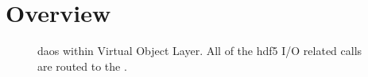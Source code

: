 \documentclass[../users_guide.tex]{subfiles}
\begin{document}
\section{Overview}

\begin{figure}
\centering

\caption{\acrshort{daos} within Virtual Object Layer. All of the \acrshort{hdf5} I/O related calls are
routed to the \dvc{}.}
\label{fig:vol}
\end{figure}
\end{document}
